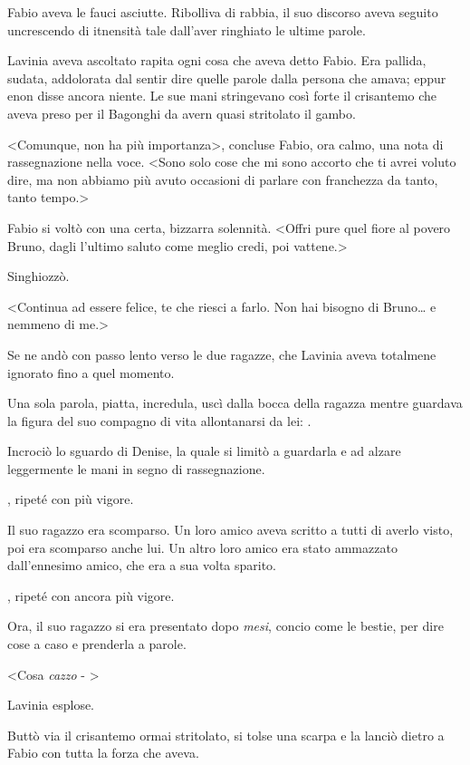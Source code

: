Fabio aveva le fauci asciutte. Ribolliva di rabbia, il suo discorso
aveva seguito uncrescendo di itnensità tale dall'aver ringhiato le
ultime parole.

Lavinia aveva ascoltato rapita ogni cosa che aveva detto Fabio. Era
pallida, sudata, addolorata dal sentir dire quelle parole dalla persona
che amava; eppur enon disse ancora niente. Le sue mani stringevano così
forte il crisantemo che aveva preso per il Bagonghi da avern quasi
stritolato il gambo.

\textless{}Comunque, non ha più importanza\textgreater{}, concluse
Fabio, ora calmo, una nota di rassegnazione nella voce. \textless{}Sono
solo cose che mi sono accorto che ti avrei voluto dire, ma non abbiamo
più avuto occasioni di parlare con franchezza da tanto, tanto
tempo.\textgreater{}

Fabio si voltò con una certa, bizzarra solennità. \textless{}Offri pure
quel fiore al povero Bruno, dagli l'ultimo saluto come meglio credi, poi
vattene.\textgreater{}

Singhiozzò.

\textless{}Continua ad essere felice, te che riesci a farlo. Non hai
bisogno di Bruno\ldots{} e nemmeno di me.\textgreater{}

Se ne andò con passo lento verso le due ragazze, che Lavinia aveva
totalmene ignorato fino a quel momento.

Una sola parola, piatta, incredula, uscì dalla bocca della ragazza
mentre guardava la figura del suo compagno di vita allontanarsi da lei:
.

Incrociò lo sguardo di Denise, la quale si limitò a guardarla e ad
alzare leggermente le mani in segno di rassegnazione.

, ripeté con più vigore.

Il suo ragazzo era scomparso. Un loro amico aveva scritto a tutti di
averlo visto, poi era scomparso anche lui. Un altro loro amico era stato
ammazzato dall'ennesimo amico, che era a sua volta sparito.

, ripeté con ancora più vigore.

Ora, il suo ragazzo si era presentato dopo \emph{mesi}, concio come le
bestie, per dire cose a caso e prenderla a parole.

\textless{}Cosa \emph{cazzo} - \textgreater{}

Lavinia esplose.

Buttò via il crisantemo ormai stritolato, si tolse una scarpa e la
lanciò dietro a Fabio con tutta la forza che aveva.

